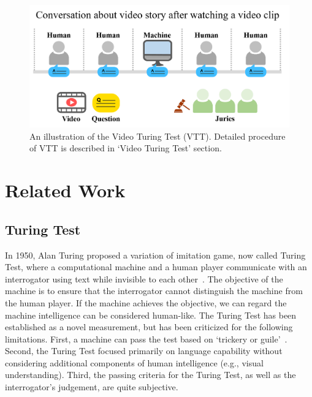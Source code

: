 \documentclass[letterpaper]{article} %
\begin{document}
\begin{figure}[t]
\centering
\includegraphics[width=0.9\columnwidth]{fig/vtt-concept.png}
\caption{An illustration of the Video Turing Test (VTT). Detailed procedure of VTT is described in `Video Turing Test' section.}
\label{fig:vtt}
\end{figure}

\section{Related Work}
\subsection{Turing Test}

In 1950, Alan Turing proposed a variation of imitation game, now called Turing Test, where a computational machine and a human player communicate with an interrogator using text while invisible to each other~\cite{turing1950computing}. The objective of the machine is to ensure that the interrogator cannot distinguish the machine from the human player. If the machine achieves the objective, we can regard the machine intelligence can be considered human-like. The Turing Test has been established as a novel measurement, but has been criticized for the following limitations. First, a machine can pass the test based on `trickery or guile'~\cite{weizenbaum1966eliza,shieber1994lessons,boden2006mind}.
Second, the Turing Test focused primarily on language capability without considering additional components of human intelligence (e.g., visual understanding). Third, the passing criteria for the Turing Test, as well as the interrogator's judgement, are quite subjective. 
\end{document}
